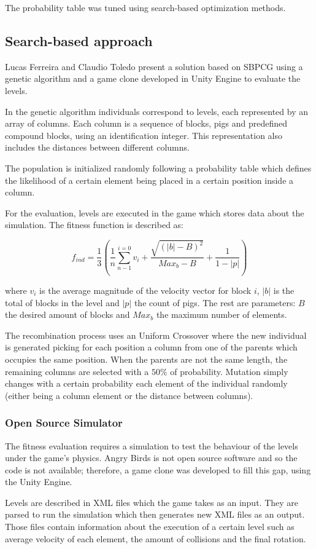 The probability table was tuned using search-based optimization methods.

\subsection{Search-based approach}

Lucas Ferreira and Claudio Toledo\cite{ferreira2014search} present a solution based on SBPCG using a genetic algorithm and a game clone developed in Unity Engine to evaluate the levels.

In the genetic algorithm individuals correspond to levels, each represented by an array of columns. Each column is a sequence of blocks, pigs and predefined compound blocks, using an identification integer. This representation also includes the distances between different columns.

The population is initialized randomly following a probability table which defines the likelihood of a certain element being placed in a certain position inside a column.

For the evaluation, levels are executed in the game which stores data about the simulation. The fitness function is described as:

$$ f_{ind} = \frac{1}{3}(\frac{1}{n} \sum_{n-1}^{i=0}{v_i}+\frac{\sqrt{(|b|-B)^2}}{Max_b-B}+ \frac{1}{1-|p|})$$ 

where $v_i$ is the average magnitude of the velocity vector for block $i$, $|b|$ is the total of blocks in the level and $|p|$ the count of pigs. The rest are parameters: $B$ the desired amount of blocks and $Max_b$ the maximum number of elements.

The recombination process uses an Uniform Crossover where the new individual is generated picking for each position a column from one of the parents which occupies the same position. When the parents are not the same length, the remaining columns are selected with a $50\%$ of probability. Mutation simply changes with a certain probability each element of the individual randomly (either being a column element or the distance between columns).

\subsubsection{Open Source Simulator}

The fitness evaluation requires a simulation to test the behaviour of the levels under the game's physics. Angry Birds is not open source software and so the code is not available; therefore, a game clone was developed to fill this gap, using the Unity Engine.

Levels are described in XML files which the game takes as an input. They are parsed to run the simulation which then generates new XML files as an output. Those files contain information about the execution of a certain level such as average velocity of each element, the amount of collisions and the final rotation. 
